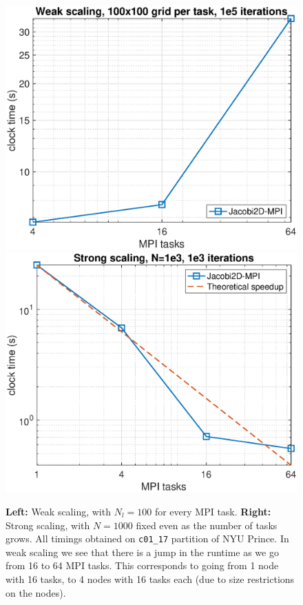 \documentclass[10pt]{article}
\begin{document}
\begin{enumerate}
\begin{figure}[!ht]
\begin{center}
\includegraphics[scale=0.39]{weakscaling_small.eps}
\includegraphics[scale=0.39]{strongscaling_small2.eps}
\end{center}
\caption{\textbf{Left:} Weak scaling, with $N_{l} = 100$ for every MPI task. \textbf{Right:} Strong scaling, with $N = 1000$ fixed even as the number of tasks grows. All timings obtained on \texttt{c01\_17} partition of NYU Prince. In weak scaling we see that there is a jump in the runtime as we go from 16 to 64 MPI tasks. This corresponds to going from 1 node with 16 tasks, to 4 nodes with 16 tasks each (due to size restrictions on the nodes).}
\label{scaling-studies}
\end{figure}


\end{enumerate}
\end{document}
